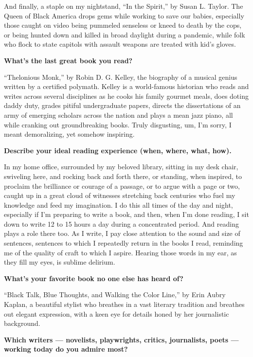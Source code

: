 And finally, a staple on my nightstand, ``In the Spirit,'' by Susan L.
Taylor. The Queen of Black America drops gems while working to save our
babies, especially those caught on video being pummeled senseless or
kneed to death by the cops, or being hunted down and killed in broad
daylight during a pandemic, while folk who flock to state capitols with
assault weapons are treated with kid's gloves.

\textbf{What's the last great book you read?}

``Thelonious Monk,'' by Robin D. G. Kelley, the biography of a musical
genius written by a certified polymath. Kelley is a world-famous
historian who reads and writes across several disciplines as he cooks
his family gourmet meals, does doting daddy duty, grades pitiful
undergraduate papers, directs the dissertations of an army of emerging
scholars across the nation and plays a mean jazz piano, all while
cranking out groundbreaking books. Truly disgusting, um, I'm sorry, I
meant demoralizing, yet somehow inspiring.

\textbf{Describe your ideal reading experience (when, where, what,
how).}

In my home office, surrounded by my beloved library, sitting in my desk
chair, swiveling here, and rocking back and forth there, or standing,
when inspired, to proclaim the brilliance or courage of a passage, or to
argue with a page or two, caught up in a great cloud of witnesses
stretching back centuries who fuel my knowledge and feed my imagination.
I do this all times of the day and night, especially if I'm preparing to
write a book, and then, when I'm done reading, I sit down to write 12 to
15 hours a day during a concentrated period. And reading plays a role
there too. As I write, I pay close attention to the sound and size of
sentences, sentences to which I repeatedly return in the books I read,
reminding me of the quality of craft to which I aspire. Hearing those
words in my ear, as they fill my eyes, is sublime delirium.

\textbf{What's your favorite book no one else has heard of?}

``Black Talk, Blue Thoughts, and Walking the Color Line,'' by Erin Aubry
Kaplan, a beautiful stylist who breathes in a vast literary tradition
and breathes out elegant expression, with a keen eye for details honed
by her journalistic background.

\textbf{Which writers --- novelists, playwrights, critics, journalists,
poets --- working today do you admire most?}

